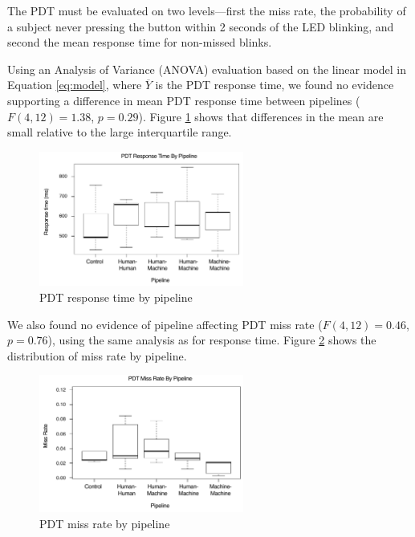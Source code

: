 The PDT must be evaluated on two levels---first the miss rate, the probability of a subject never pressing the button within 2 seconds of the LED blinking, and second the mean response time for non-missed blinks.

Using an Analysis of Variance (ANOVA) evaluation based on the linear model in Equation \ref{eq:model}, where $\overline{Y}$ is the PDT response time, we found no evidence supporting a difference in mean PDT response time between pipelines ($F(4, 12) = 1.38$, $p=0.29$). Figure \ref{fig:plot:responsetime} shows that differences in the mean are small relative to the large interquartile range.

\begin{figure}[htbp]
  \centering
  \includegraphics[width=0.6\textwidth]{images/plot_responsetime.pdf}
  \caption{PDT response time by pipeline}
  \label{fig:plot:responsetime}
\end{figure}

We also found no evidence of pipeline affecting PDT miss rate ($F(4, 12) = 0.46$, $p=0.76$), using the same analysis as for response time. Figure \ref{fig:plot:missrate}  shows the distribution of miss rate by pipeline.

\begin{figure}[htbp]
  \centering
  \includegraphics[width=0.6\textwidth]{images/plot_misses.pdf}
  \caption{PDT miss rate by pipeline}
  \label{fig:plot:missrate}
\end{figure}

